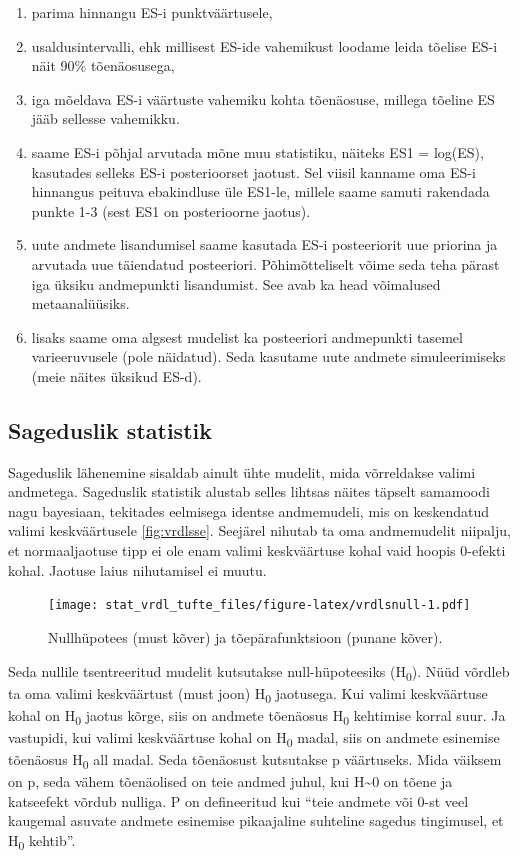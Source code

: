 \documentclass[]{book}
\begin{document}
\begin{enumerate}
\def\labelenumi{\arabic{enumi}.}
\item
  parima hinnangu ES-i punktväärtusele,
\item
  usaldusintervalli, ehk millisest ES-ide vahemikust loodame leida
  tõelise ES-i näit 90\% tõenäosusega,
\item
  iga mõeldava ES-i väärtuste vahemiku kohta tõenäosuse, millega tõeline
  ES jääb sellesse vahemikku.
\item
  saame ES-i põhjal arvutada mõne muu statistiku, näiteks ES1 = log(ES),
  kasutades selleks ES-i posterioorset jaotust. Sel viisil kanname oma
  ES-i hinnangus peituva ebakindluse üle ES1-le, millele saame samuti
  rakendada punkte 1-3 (sest ES1 on posterioorne jaotus).
\item
  uute andmete lisandumisel saame kasutada ES-i posteeriorit uue
  priorina ja arvutada uue täiendatud posteeriori. Põhimõtteliselt võime
  seda teha pärast iga üksiku andmepunkti lisandumist. See avab ka head
  võimalused metaanalüüsiks.
\item
  lisaks saame oma algsest mudelist ka posteeriori andmepunkti tasemel
  varieeruvusele (pole näidatud). Seda kasutame uute andmete
  simuleerimiseks (meie näites üksikud ES-d).
\end{enumerate}

\subsection*{Sageduslik statistik}\label{sageduslik-statistik-1}

Sageduslik lähenemine sisaldab ainult ühte mudelit, mida võrreldakse
valimi andmetega. Sageduslik statistik alustab selles lihtsas näites
täpselt samamoodi nagu bayesiaan, tekitades eelmisega identse
andmemudeli, mis on keskendatud valimi keskväärtusele \ref{fig:vrdlsse}.
Seejärel nihutab ta oma andmemudelit niipalju, et normaaljaotuse tipp ei
ole enam valimi keskväärtuse kohal vaid hoopis 0-efekti kohal. Jaotuse
laius nihutamisel ei muutu.

\begin{figure}
\centering
\texttt{[image: stat\_vrdl\_tufte\_files/figure-latex/vrdlsnull-1.pdf]}
\caption{\label{fig:vrdlsnull}Nullhüpotees (must kõver) ja tõepärafunktsioon
(punane kõver).}
\end{figure}

Seda nullile tsentreeritud mudelit kutsutakse null-hüpoteesiks
(H\textsubscript{0}). Nüüd võrdleb ta oma valimi keskväärtust (must
joon) H\textsubscript{0} jaotusega. Kui valimi keskväärtuse kohal on
H\textsubscript{0} jaotus kõrge, siis on andmete tõenäosus
H\textsubscript{0} kehtimise korral suur. Ja vastupidi, kui valimi
keskväärtuse kohal on H\textsubscript{0} madal, siis on andmete
esinemise tõenäosus H\textsubscript{0} all madal. Seda tõenäosust
kutsutakse p väärtuseks. Mida väiksem on p, seda vähem tõenäolised on
teie andmed juhul, kui H\textasciitilde{}0 on tõene ja katseefekt võrdub
nulliga. P on defineeritud kui ``teie andmete või 0-st veel kaugemal
asuvate andmete esinemise pikaajaline suhteline sagedus tingimusel, et
H\textsubscript{0} kehtib''.
\end{document}
